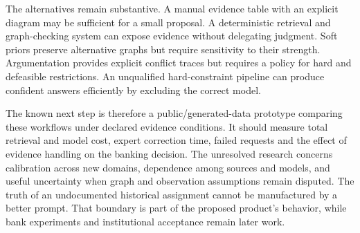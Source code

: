 The alternatives remain substantive. A manual evidence table with an
explicit diagram may be sufficient for a small proposal. A deterministic
retrieval and graph-checking system can expose evidence without
delegating judgment. Soft priors preserve alternative graphs but require
sensitivity to their strength. Argumentation provides explicit conflict
traces but requires a policy for hard and defeasible restrictions. An
unqualified hard-constraint pipeline can produce confident answers
efficiently by excluding the correct model.

The known next step is therefore a public/generated-data prototype
comparing these workflows under declared evidence conditions. It should
measure total retrieval and model cost, expert correction time, failed
requests and the effect of evidence handling on the banking decision.
The unresolved research concerns calibration across new domains,
dependence among sources and models, and useful uncertainty when graph
and observation assumptions remain disputed. The truth of an
undocumented historical assignment cannot be manufactured by a better
prompt. That boundary is part of the proposed product's behavior, while
bank experiments and institutional acceptance remain later work.

\label{exec14:expert-evidence-end}
